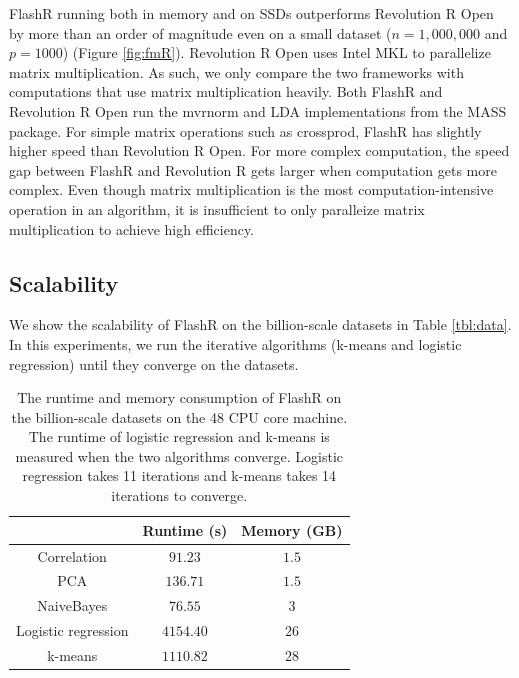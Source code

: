 FlashR running both in memory and on SSDs outperforms Revolution R Open by more
than an order of magnitude even on a small dataset ($n=1,000,000$ and $p=1000$)
(Figure \ref{fig:fmR}).
Revolution R Open uses Intel MKL to parallelize matrix multiplication. As such,
we only compare the two frameworks with computations that use matrix
multiplication heavily. Both FlashR and Revolution R Open run the mvrnorm
and LDA implementations from the MASS package. For simple matrix operations such as crossprod,
FlashR has slightly higher speed than Revolution R Open. For more complex
computation, the speed gap between FlashR and Revolution R gets larger when
computation gets more complex. Even though matrix multiplication
is the most computation-intensive operation in an algorithm, it is insufficient
to only paralleize matrix multiplication to achieve high efficiency.

\subsection{Scalability}

We show the scalability of FlashR on the billion-scale datasets in Table
\ref{tbl:data}. In this experiments, we run the iterative algorithms
(k-means and logistic regression) until they converge on the datasets.

\begin{table}
\begin{center}
\footnotesize
\begin{tabular}{|c|c|c|}
\hline
	& Runtime (s) & Memory (GB) \\
\hline
Correlation & $91.23$ & $1.5$ \\
\hline
PCA & $136.71$ & $1.5$ \\
\hline
NaiveBayes & $76.55$ & $3$ \\
\hline
Logistic regression & $4154.40$ & $26$ \\
\hline
k-means & $1110.82$ & $28$ \\
\hline
\end{tabular}
\normalsize
\end{center}
\caption{The runtime and memory consumption of FlashR on the billion-scale
	datasets on the 48 CPU core machine.
	The runtime of logistic regression and k-means is measured when the two
	algorithms converge. Logistic regression takes 11 iterations and k-means
	takes 14 iterations to converge.}
\label{tbl:scale}
\end{table}

